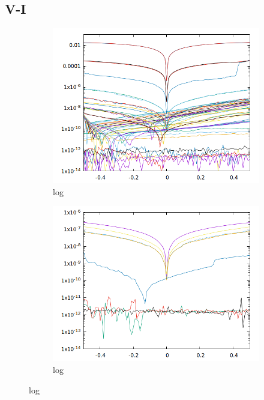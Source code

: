 \subsection{V-I}
\begin{figure}
    \centering
    \begin{subfigure}{.3\textwidth}
        \includegraphics[width=\textwidth]{Pics/iv/log-146-good-10x1F.png}
        \caption{log} \label{fig:log1}
    \end{subfigure}
    \begin{subfigure}{.3\textwidth}
        \includegraphics[width=\textwidth]{Pics/iv/log-154-okay-3x4F.png}
        \caption{log} \label{fig:log2}
    \end{subfigure}

\end{figure}

